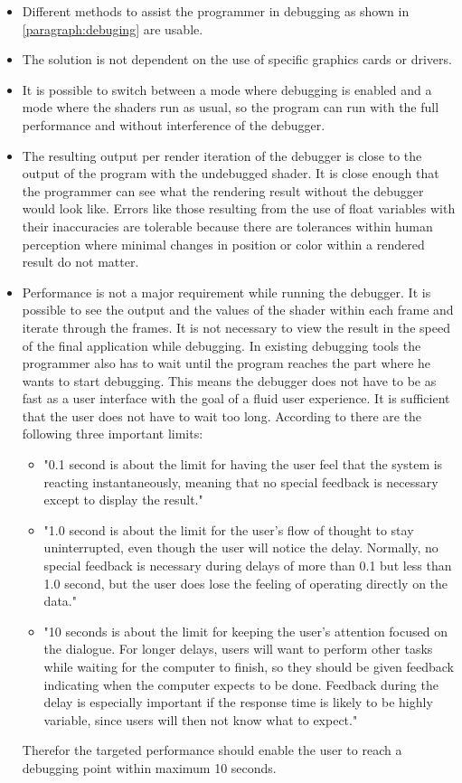 \begin{itemize}
	\item Different methods to assist the programmer in debugging as shown in \autoref{paragraph:debuging} are usable.
	\item The solution is not dependent on the use of specific graphics cards or drivers.
	\item It is possible to switch between a mode where debugging is enabled and a mode where the shaders run as usual, so the program can run with the full performance and without interference of the debugger.
	\item The resulting output per render iteration of the debugger is close to the output of the program with the undebugged shader. It is close enough that the programmer can see what the rendering result without the debugger would look like. Errors like those resulting from the use of float variables with their inaccuracies are tolerable because there are tolerances within human perception where minimal changes in position or color within a rendered result do not matter.
	\item Performance is not a major requirement while running the debugger. It is possible to see the output and the values of the shader within each frame and iterate through the frames. It is not necessary to view the result in the speed of the final application while debugging. In existing debugging tools the programmer also has to wait until the program reaches the part where he wants to start debugging. This means the debugger does not have to be as fast as a user interface with the goal of a fluid user experience. It is sufficient that the user does not have to wait too long. According to  there are the following three important limits:
	\begin{itemize}
	\item "0.1 second is about the limit for having the user feel that the system is reacting instantaneously, meaning that no special feedback is necessary except to display the result."
	\item "1.0 second is about the limit for the user's flow of thought to stay uninterrupted, even though the user will notice the delay. Normally, no special feedback is necessary during delays of more than 0.1 but less than 1.0 second, but the user does lose the feeling of operating directly on the data."
    \item "10 seconds is about the limit for keeping the user's attention focused on the dialogue. For longer delays, users will want to perform other tasks while waiting for the computer to finish, so they should be given feedback indicating when the computer expects to be done. Feedback during the delay is especially important if the response time is likely to be highly variable, since users will then not know what to expect."
	\end{itemize}
	Therefor the targeted performance should enable the user to reach a debugging point within maximum 10 seconds.
\end{itemize}




